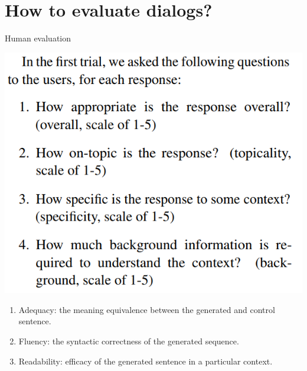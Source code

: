 \documentclass[10pt]{beamer}
\begin{document}
\section{How to evaluate dialogs?}


\begin{frame}{Human evaluation  \cite{Lowe:2016}}
\begin{center}
\includegraphics[scale=0.2]{images/exemploEval1.png}
\end{center}

\begin{enumerate}
\item \alert{Adequacy}: the meaning equivalence between the generated and control sentence. 
\item \alert{Fluency}: the syntactic correctness of the generated sequence.
\item \alert{Readability}: efficacy of the generated sentence in a particular context.
\end{enumerate}

\end{frame}
\end{document}
